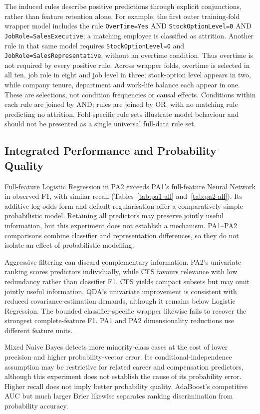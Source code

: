 The induced rules describe positive predictions through explicit conjunctions,
rather than feature retention alone. For example, the first outer training-fold
wrapper model includes the rule \texttt{OverTime=Yes} AND
\texttt{StockOptionLevel=0} AND \texttt{JobRole=SalesExecutive}; a matching
employee is classified as attrition. Another rule in that same model requires
\texttt{StockOptionLevel=0} and \texttt{JobRole=SalesRepresentative}, without
an overtime condition. Thus overtime is not required by every positive rule.
Across wrapper folds, overtime is selected in all ten, job role in eight and
job level in three; stock-option level appears in two, while company tenure,
department and work-life balance each appear in one. These are selections,
not condition frequencies or causal effects. Conditions within each rule are
joined by AND; rules are joined by OR, with no matching rule predicting no
attrition. Fold-specific rule sets illustrate model behaviour and should not
be presented as a single universal full-data rule set.

\subsection{Integrated Performance and Probability Quality}
Full-feature Logistic Regression in PA2 exceeds PA1's full-feature Neural Network in observed F1, with similar recall (Tables~\ref{tab:pa1-all} and~\ref{tab:pa2-all}). Its additive log-odds form and default regularisation offer a comparatively simple probabilistic model. Retaining all predictors may preserve jointly useful information, but this experiment does not establish a mechanism. PA1--PA2 comparisons combine classifier and representation differences, so they do not isolate an effect of probabilistic modelling.

Aggressive filtering can discard complementary information. PA2's univariate ranking scores predictors individually, while CFS favours relevance with low redundancy rather than classifier F1. CFS yields compact subsets but may omit jointly useful information. QDA's univariate improvement is consistent with reduced covariance-estimation demands, although it remains below Logistic Regression. The bounded classifier-specific wrapper likewise fails to recover the strongest complete-feature F1. PA1 and PA2 dimensionality reductions use different feature units.

Mixed Naive Bayes detects more minority-class cases at the cost of lower precision and higher probability-vector error. Its conditional-independence assumption may be restrictive for related career and compensation predictors, although this experiment does not establish the cause of its probability error. Higher recall does not imply better probability quality. AdaBoost's competitive AUC but much larger Brier likewise separates ranking discrimination from probability accuracy.

